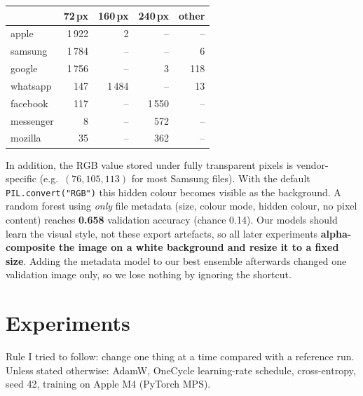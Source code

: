 \documentclass[11pt,a4paper]{article}
\newcommand{\code}[1]{\texttt{#1}}
\begin{document}
\begin{center}\small
\begin{tabular}{lrrrr}
\toprule
 & 72\,px & 160\,px & 240\,px & other \\
\midrule
apple     & 1\,922 & 2 & -- & -- \\
samsung   & 1\,784 & -- & -- & 6 \\
google    & 1\,756 & -- & 3 & 118 \\
whatsapp  & 147 & 1\,484 & -- & 13 \\
facebook  & 117 & -- & 1\,550 & -- \\
messenger & 8 & -- & 572 & -- \\
mozilla   & 35 & -- & 362 & -- \\
\bottomrule
\end{tabular}
\end{center}

\noindent In addition, the RGB value stored under fully transparent pixels is vendor-specific
(e.g.\ $(76,105,113)$ for most Samsung files). With the default \code{PIL.convert("RGB")} this hidden
colour becomes visible as the background. A random forest using \emph{only} file metadata
(size, colour mode, hidden colour, no pixel content) reaches \textbf{0.658} validation accuracy
(chance 0.14). Our models should learn the visual style, not these export artefacts, so all later
experiments \textbf{alpha-composite the image on a white background and resize it to a fixed size}.
Adding the metadata model to our best ensemble afterwards changed one validation image only, so
we lose nothing by ignoring the shortcut.

\section{Experiments}
Rule I tried to follow: change one thing at a time compared with a reference run.
Unless stated otherwise: AdamW, OneCycle learning-rate schedule, cross-entropy, seed 42,
training on Apple M4 (PyTorch MPS).
\end{document}
